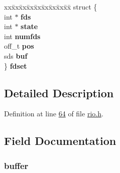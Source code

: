 \begin{DoxyCompactItemize}
\begin{tabbing}
\end{tabbing}\item 
\mbox{\label{union__rio_8io_a02576d32deb49384ad8ebc30550d8c29}} 
\begin{tabbing}
xx\=xx\=xx\=xx\=xx\=xx\=xx\=xx\=xx\=\kill
struct \{\\
\mbox{\label{struct__rio_1_1_0D4_1_1_0D7_a7805e59e6aa34bf51914235caa1be6c4}} 
int $\ast$ {\bfseries fds}\\
\mbox{\label{struct__rio_1_1_0D4_1_1_0D7_a22d57b0b9a9474fcbc93950b00e06395}} 
int $\ast$ {\bfseries state}\\
\mbox{\label{struct__rio_1_1_0D4_1_1_0D7_a560eddd13fc5425161fca489bc13f165}} 
int {\bfseries numfds}\\
\mbox{\label{struct__rio_1_1_0D4_1_1_0D7_aa1ca4b916242c44445ca68f647fc0878}} 
off\_t {\bfseries pos}\\
\mbox{\label{struct__rio_1_1_0D4_1_1_0D7_ad5582e2496733a9bcb35e6e9306be331}} 
sds {\bfseries buf}\\
\} {\bfseries fdset}\\

\end{tabbing}\end{DoxyCompactItemize}


\subsection{Detailed Description}


Definition at line \hyperlink{rio_8h_source_l00064}{64} of file \hyperlink{rio_8h_source}{rio.\+h}.



\subsection{Field Documentation}
\mbox{\label{union__rio_8io_a7f2db423a49b305459147332fb01cf87}} 
\subsubsection{\texorpdfstring{buffer}{buffer}}
{\footnotesize\ttfamily }

